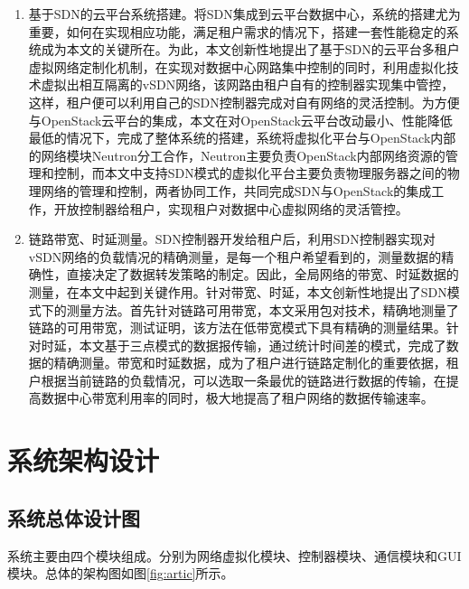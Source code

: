 \begin{enumerate}
\item 基于SDN的云平台系统搭建。将SDN集成到云平台数据中心，系统的搭建尤为重要，如何在实现相应功能，满足租户需求的情况下，搭建一套性能稳定的系统成为本文的关键所在。为此，本文创新性地提出了基于SDN的云平台多租户虚拟网络定制化机制，在实现对数据中心网路集中控制的同时，利用虚拟化技术虚拟出相互隔离的vSDN网络，该网路由租户自有的控制器实现集中管控，这样，租户便可以利用自己的SDN控制器完成对自有网络的灵活控制。为方便与OpenStack云平台的集成，本文在对OpenStack云平台改动最小、性能降低最低的情况下，完成了整体系统的搭建，系统将虚拟化平台与OpenStack内部的网络模块Neutron分工合作，Neutron主要负责OpenStack内部网络资源的管理和控制，而本文中支持SDN模式的虚拟化平台主要负责物理服务器之间的物理网络的管理和控制，两者协同工作，共同完成SDN与OpenStack的集成工作，开放控制器给租户，实现租户对数据中心虚拟网络的灵活管控。
\item 链路带宽、时延测量。SDN控制器开发给租户后，利用SDN控制器实现对vSDN网络的负载情况的精确测量，是每一个租户希望看到的，测量数据的精确性，直接决定了数据转发策略的制定。因此，全局网络的带宽、时延数据的测量，在本文中起到关键作用。针对带宽、时延，本文创新性地提出了SDN模式下的测量方法。首先针对链路可用带宽，本文采用包对技术，精确地测量了链路的可用带宽，测试证明，该方法在低带宽模式下具有精确的测量结果。针对时延，本文基于三点模式的数据报传输，通过统计时间差的模式，完成了数据的精确测量。带宽和时延数据，成为了租户进行链路定制化的重要依据，租户根据当前链路的负载情况，可以选取一条最优的链路进行数据的传输，在提高数据中心带宽利用率的同时，极大地提高了租户网络的数据传输速率。
\end{enumerate}

\section{系统架构设计}
\subsection{系统总体设计图}
系统主要由四个模块组成。分别为网络虚拟化模块、控制器模块、通信模块和GUI模块。总体的架构图如图\ref{fig:artic}所示。

